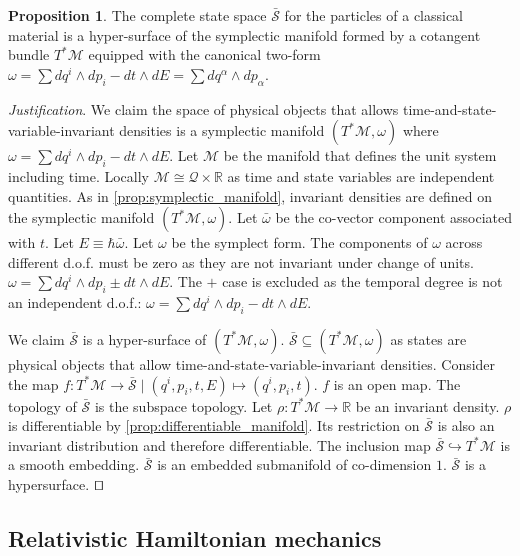 \documentclass[smallextended]{svjour3}
\numberwithin{equation}{section}
\newenvironment{justification}{\emph{Justification}.}{\hfill\(\qed\)}
\theoremstyle{definition}
\newtheorem{prop}[equation]{Proposition}
\newenvironment{justification}{\emph{Justification}.}{\qed}
\begin{document}
\begin{prop}\label{prop:relativistic_symplectic_manifold}
	The complete state space $\bar{\mathcal{S}}$ for the particles of a classical material is a hyper-surface of the symplectic manifold formed by a cotangent bundle $T^*\mathcal{M}$ equipped with the canonical two-form $\omega = \sum dq^i \wedge dp_i - dt \wedge dE = \sum dq^\alpha \wedge dp_\alpha$.
\end{prop}

\begin{justification}
	We claim the space of physical objects that allows time-and-state-variable-invariant densities is a symplectic manifold $(T^*\mathcal{M}, \omega)$ where $\omega = \sum dq^i \wedge dp_i - dt \wedge dE$. Let $\mathcal{M}$ be the manifold that defines the unit system including time. Locally $\mathcal{M} \cong \mathcal{Q} \times \mathbb{R}$ as time and state variables are independent quantities. As in \ref{prop:symplectic_manifold}, invariant densities are defined on the symplectic manifold $(T^*\mathcal{M}, \omega)$. Let $\bar{\omega}$ be the co-vector component associated with $t$. Let $E\equiv\hbar \bar{\omega}$. Let $\omega$ be the symplect form. The components of $\omega$ across different d.o.f. must be zero as they are not invariant under change of units. $\omega=\sum dq^i \wedge dp_i \pm dt \wedge dE$. The $+$ case is excluded as the temporal degree is not an independent d.o.f.: $\omega = \sum dq^i \wedge dp_i - dt \wedge dE$.
	
	We claim $\bar{\mathcal{S}}$ is a hyper-surface of $(T^*\mathcal{M}, \omega)$. $\bar{\mathcal{S}} \subseteq (T^*\mathcal{M}, \omega)$ as states are physical objects that allow time-and-state-variable-invariant densities. Consider the map $f : T^*\mathcal{M} \rightarrow \bar{\mathcal{S}} \; | \; (q^i, p_i, t, E) \mapsto (q^i, p_i, t)$. $f$ is an open map. The topology of $\bar{\mathcal{S}}$ is the subspace topology. Let $\rho : T^*\mathcal{M} \rightarrow \mathbb{R}$ be an invariant density. $\rho$ is differentiable by \ref{prop:differentiable_manifold}. Its restriction on $\bar{\mathcal{S}}$ is also an invariant distribution and therefore differentiable. The inclusion map $\bar{\mathcal{S}} \hookrightarrow T^*\mathcal{M}$ is a smooth embedding. $\bar{\mathcal{S}}$ is an embedded submanifold of co-dimension $1$. $\bar{\mathcal{S}}$ is a hypersurface.
\end{justification}


\subsection{Relativistic Hamiltonian mechanics}
\end{document}
